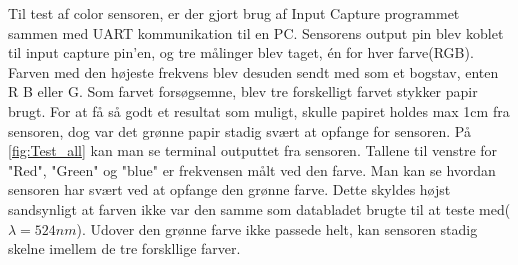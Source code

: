 Til test af color sensoren, er der gjort brug af Input Capture programmet sammen med UART kommunikation til en PC. Sensorens output pin blev koblet til input capture pin'en, og tre målinger blev taget, én for hver farve(RGB). Farven med den højeste frekvens blev desuden sendt med som et bogstav, enten R B eller G. Som farvet forsøgsemne, blev tre forskelligt farvet stykker papir brugt. For at få så godt et resultat som muligt, skulle papiret holdes max 1cm fra sensoren, dog var det grønne papir stadig svært at opfange for sensoren. På \autoref{fig:Test_all} kan man se terminal outputtet fra sensoren. Tallene til venstre for "Red", "Green" og "blue" er frekvensen målt ved den farve. Man kan se hvordan sensoren har svært ved at opfange den grønne farve. Dette skyldes højst sandsynligt at farven ikke var den samme som databladet brugte til at teste med($\lambda = 524 nm$)\cite{man:TC3200}. Udover den grønne farve ikke passede helt, kan sensoren stadig skelne imellem de tre forskllige farver.

